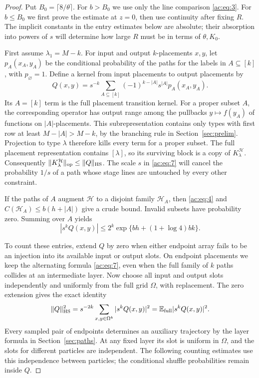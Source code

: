 \begin{proof}
Put \(B_0=\lceil8/\theta\rceil\). For \(b>B_0\) we use only the line comparison
\eqref{ac:eq:3}. For \(b\le B_0\) we first prove the estimate at \(z=0\), then
use continuity after fixing \(R\). The implicit constants in the entry
estimates below are absolute; their absorption into powers of \(s\) will
determine how large \(R\) must be in terms of \(\theta,K_0\).

First assume \(\lambda_1=M-k\). For input and output \(k\)-placements \(x,y\),
let \(p_A(x_A,y_A)\) be the conditional probability of the paths for the
labels in \(A\subseteq[k]\), with \(p_\varnothing=1\). Define a kernel from
input placements to output placements by
\begin{equation}
 Q(x,y)=s^{-k}\sum_{A\subseteq[k]}(-1)^{k-|A|}s^{|A|}p_A(x_A,y_A).
 \label{ac:eq:7}
\end{equation}
Its \(A=[k]\) term is the full placement transition kernel. For a proper
subset \(A\), the corresponding operator has output range among the
pullbacks \(y\mapsto f(y_A)\) of functions on \(|A|\)-placements. This
subrepresentation contains only types with first row at least
\(M-|A|>M-k\), by the branching rule in Section~\ref{sec:prelim}. Projection
to type \(\lambda\) therefore kills every term for a proper subset. The full
placement representation contains \([\lambda]\), so its surviving block is a
copy of \(K_\lambda^{\mathcal H}\). Consequently
\(\|K_\lambda^{\mathcal H}\|_{\rm op}\le\|Q\|_{\rm HS}\).
The scale \(s\) in \eqref{ac:eq:7} will cancel the probability \(1/s\) of a
path whose stage lines are untouched by every other constraint.

If the paths of \(A\) augment \(\mathcal H\) to a disjoint family
\(\mathcal H_A\), then \eqref{ac:eq:4} and
\(C(\mathcal H_A)\le b(h+|A|)\) give a crude bound. Invalid subsets have
probability zero. Summing over \(A\) yields
\begin{equation}
 |s^kQ(x,y)|\le 2^k\exp\{bh+(1+\log4)bk\}.
 \label{ac:eq:8}
\end{equation}

To count these entries, extend \(Q\) by zero when either endpoint array fails
to be an injection into its available input or output slots. On endpoint
placements we keep the alternating formula \eqref{ac:eq:7}, even when the
full family of \(k\) paths collides at an intermediate layer. Now choose all
input and output slots independently and uniformly from the full grid
\(\Omega\), with replacement. The zero extension gives the exact identity
\[
 \|Q\|_{\rm HS}^2
 =s^{-2k}\sum_{x,y\in\Omega^k}|s^kQ(x,y)|^2
 =\mathbb E_{\rm full}|s^kQ(x,y)|^2.
\]
Every sampled pair of endpoints determines an auxiliary trajectory by the
layer formula in Section~\ref{sec:paths}. At any fixed layer its slot is
uniform in \(\Omega\), and the slots for different particles are independent.
The following counting estimates use this independence between particles;
the conditional shuffle probabilities remain inside \(Q\).


\end{proof}
